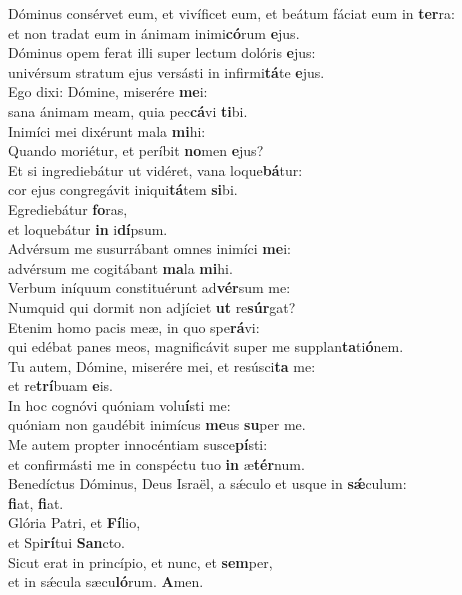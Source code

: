 \evenverse Dóminus consérvet eum, et vivíficet eum, et beátum fáciat eum in \textbf{ter}ra:~\*\\
\evenverse et non tradat eum in ánimam inimi\textbf{có}rum \textbf{e}jus.\\
\oddverse Dóminus opem ferat illi super lectum dolóris \textbf{e}jus:~\*\\
\oddverse univérsum stratum ejus versásti in infirmi\textbf{tá}te \textbf{e}jus.\\
\evenverse Ego dixi: Dómine, miserére \textbf{me}i:~\*\\
\evenverse sana ánimam meam, quia pec\textbf{cá}vi \textbf{ti}bi.\\
\oddverse Inimíci mei dixérunt mala \textbf{mi}hi:~\*\\
\oddverse Quando moriétur, et períbit \textbf{no}men \textbf{e}jus?\\
\evenverse Et si ingrediebátur ut vidéret, vana loque\textbf{bá}tur:~\*\\
\evenverse cor ejus congregávit iniqui\textbf{tá}tem \textbf{si}bi.\\
\oddverse Egrediebátur \textbf{fo}ras,~\*\\
\oddverse et loquebátur \textbf{in} i\textbf{dí}psum.\\
\evenverse Advérsum me susurrábant omnes inimíci \textbf{me}i:~\*\\
\evenverse advérsum me cogitábant \textbf{ma}la \textbf{mi}hi.\\
\oddverse Verbum iníquum constituérunt ad\textbf{vér}sum me:~\*\\
\oddverse Numquid qui dormit non adjíciet \textbf{ut} re\textbf{súr}gat?\\
\evenverse Etenim homo pacis meæ, in quo spe\textbf{rá}vi:~\*\\
\evenverse qui edébat panes meos, magnificávit super me supplan\textbf{ta}ti\textbf{ó}nem.\\
\oddverse Tu autem, Dómine, miserére mei, et resúsci\textbf{ta} me:~\*\\
\oddverse et re\textbf{trí}buam \textbf{e}is.\\
\evenverse In hoc cognóvi quóniam volu\textbf{í}sti me:~\*\\
\evenverse quóniam non gaudébit inimícus \textbf{me}us \textbf{su}per me.\\
\oddverse Me autem propter innocéntiam susce\textbf{pí}sti:~\*\\
\oddverse et confirmásti me in conspéctu tuo \textbf{in} æ\textbf{tér}num.\\
\evenverse Benedíctus Dóminus, Deus Israël, a sǽculo et usque in \textbf{sǽ}culum:~\*\\
\evenverse \textbf{fi}at, \textbf{fi}at.\\
\oddverse Glória Patri, et \textbf{Fí}lio,~\*\\
\oddverse et Spi\textbf{rí}tui \textbf{San}cto.\\
\evenverse Sicut erat in princípio, et nunc, et \textbf{sem}per,~\*\\
\evenverse et in sǽcula sæcu\textbf{ló}rum. \textbf{A}men.\\
